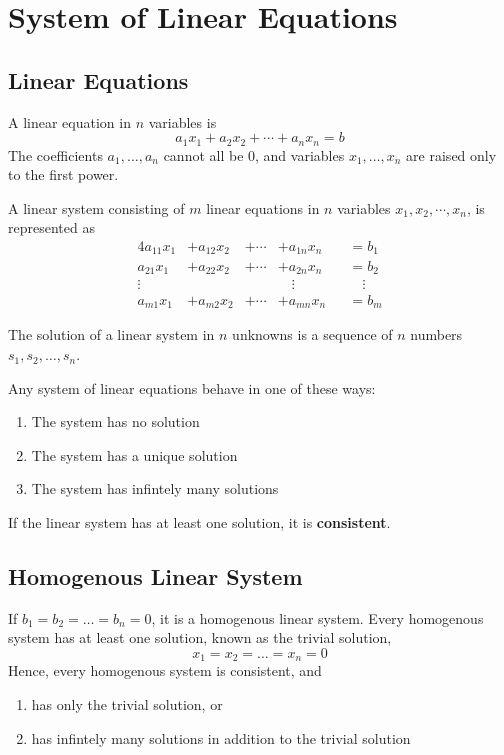 \documentclass[../linear-algebra.tex]{subfiles}
\begin{document}
\section{System of Linear Equations}
\subsection{Linear Equations}
A linear equation in $n$ variables is
\[a_1x_1 + a_2x_2 + \cdots + a_nx_n = b\]
The coefficients $a_1,\ldots,a_n$ cannot all be 0, 
and variables $x_1,\ldots,x_n$ are raised only to the first power.

\noindent A linear system consisting of $m$ linear equations in $n$ variables
$x_1, x_2, \cdots, x_n$, is represented as
\begin{alignat*}{4}
    a_{11}x_1 &+ a_{12}x_2 &+ \cdots &+ a_{1n}x_n &&= b_1 \\
    a_{21}x_1 &+ a_{22}x_2 &+ \cdots &+ a_{2n}x_n &&= b_2 \\
    \vdots    & \quad &         & \quad \vdots && \quad \vdots \\
    a_{m1}x_1 &+ a_{m2}x_2 &+ \cdots &+ a_{mn}x_n &&= b_m
\end{alignat*}

\noindent The solution of a linear system in $n$ unknowns is a sequence of $n$ numbers
$s_1, s_2,\ldots,s_n$.

\medskip

\noindent Any system of linear equations behave in one of these ways:
\begin{enumerate}
    \item The system has no solution
    \item The system has a unique solution
    \item The system has infintely many solutions
\end{enumerate}

\noindent If the linear system has at least one solution, it is \textbf{consistent}. 

\subsection{Homogenous Linear System}
\noindent If $b_1=b_2=\ldots=b_n=0$, it is a homogenous linear system.
Every homogenous system has at least one solution, known as the trivial solution,
\[x_1 = x_2 = \ldots = x_n = 0\]
Hence, every homogenous system is consistent, and 
\begin{enumerate}
    \item has only the trivial solution, or
    \item has infintely many solutions in addition to the trivial solution
\end{enumerate}
\end{document}
